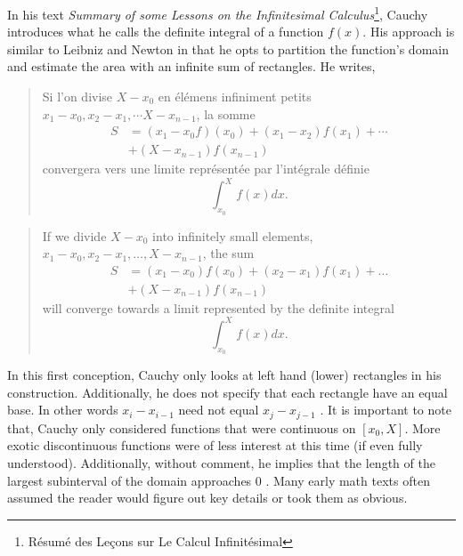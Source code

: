 \documentclass{article}
\theoremstyle{axiom} \newtheorem{axiom}{Axiom}
\theoremstyle{definition} \newtheorem{definition}{Definition}
\theoremstyle{example} \newtheorem{example}{Example}
\theoremstyle{proposition} \newtheorem{prop}{Proposition}
\theoremstyle{lemma} \newtheorem{lemma}{Lemma}
\begin{document}
In his text \textit{Summary of some Lessons on the Infinitesimal 
Calculus}\footnote{Résumé des Leçons sur Le Calcul Infinitésimal}, Cauchy 
introduces what he calls the definite  integral of a function $f(x)$. His
approach is similar to Leibniz and Newton in that he opts to partition the function's
domain and estimate the area with an infinite sum of rectangles. He writes, 
\begin{multicols}{2}
\begin{quote}
	Si l'on divise $X - x_0$ en élémens infiniment petits $x_1-x_0,
	x_2-x_1,\cdots X-x_{n-1}$, la somme 
	\begin{equation*}
	\begin{split}
		S&=(x_1-x_0 f)(x_0)+(x_1-x_2)f(x_1) + \cdots \\
		 & +(X-x_{n-1})f(x_{n-1})
	\end{split}
	\end{equation*}
	convergera vers une limite représentée par l'intégrale définie
	\begin{equation*}
		\int^X_{x_0} f(x) dx.
	\end{equation*}
\end{quote}
\begin{quote}
	If we divide $X - x_0$ into infinitely small elements,
	$x_1 - x_0,x_2 - x_1, \ldots, X - x_{n-1}$, the sum
	\begin{equation*}
	\begin{split}
		S &= (x_1 - x_0)f(x_0)+(x_2-x_1)f(x_1) + \ldots \\
		&+(X- x_{n-1})f(x_{n-1})
	\end{split}
	\end{equation*}
	will converge towards a limit represented by the definite integral
	\begin{equation*}
		\int^{X}_{x_0} f(x) dx.
	\end{equation*}
\end{quote}
\end{multicols}

In this first conception, Cauchy only looks at left hand (lower) rectangles in his 
construction. Additionally, he does not specify that each rectangle have an 
equal base. In other words $x_i - x_{i-1}$ need not equal $x_j - x_{j-1}$
\cite{gillespie:1915}. It is important to  note that, Cauchy only considered
functions that were continuous on $[x_0,X]$. More exotic discontinuous functions 
were of less interest at this time (if even fully understood). Additionally, 
without comment, he implies that  the length of the largest subinterval of the domain approaches $0$
\cite{kline:1972}. Many early math texts often assumed the reader would figure
out key details or took them as obvious. 
\end{document}

